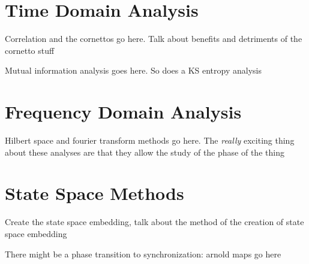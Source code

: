 \documentclass[12pt]{article}
\begin{document}
\section{Time Domain Analysis}



Correlation and the cornettos go here. Talk about benefits and detriments of the cornetto stuff


Mutual information analysis goes here. So does a KS entropy analysis

\section{Frequency Domain Analysis}
Hilbert space and fourier transform methods go here. The \emph{really} exciting thing about these analyses are that they allow the study of the phase of the thing


\section{State Space Methods}

Create the state space embedding, talk about the method of the creation of state space embedding

There might be a phase transition to synchronization: arnold maps go here

%
%
%
%
%
%
%
\end{document}
